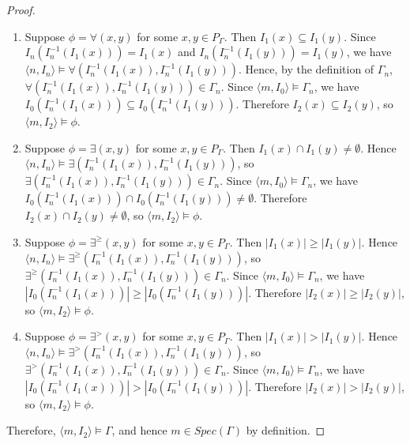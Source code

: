 \documentclass[12pt, reqno]{amsart}
\theoremstyle{definition}
\theoremstyle{remark}
\numberwithin{equation}{section}
\begin{document}
\begin{proof}
\begin{enumerate}

	\item Suppose $\phi=\forall(x,y)$ for some $x,y\in P_\Gamma$. Then $I_1(x)\subseteq I_1(y)$. Since $I_n(I_n^{-1}(I_1(x)))=I_1(x)$ and $I_n(I_n^{-1}(I_1(y)))=I_1(y)$, we have $\langle n,I_n\rangle\models\forall(I_n^{-1}(I_1(x)),I_n^{-1}(I_1(y)))$. Hence, by the definition of $\Gamma_n$, \\$\forall(I_n^{-1}(I_1(x)),I_n^{-1}(I_1(y)))\in\Gamma_n$. Since $\langle m,I_0\rangle\models\Gamma_n$, we have $I_0(I_n^{-1}(I_1(x)))\subseteq I_0(I_n^{-1}(I_1(y)))$. Therefore $I_2(x)\subseteq I_2(y)$, so $\langle m,I_2\rangle\models\phi$.

	\item Suppose $\phi=\exists(x,y)$ for some $x,y\in P_\Gamma$. Then $I_1(x)\cap I_1(y)\neq\emptyset$. Hence $\langle n,I_n\rangle\models\exists(I_n^{-1}(I_1(x)),I_n^{-1}(I_1(y)))$, so $\exists(I_n^{-1}(I_1(x)),I_n^{-1}(I_1(y)))\in\Gamma_n$. Since $\langle m,I_0\rangle\models\Gamma_n$, we have $I_0(I_n^{-1}(I_1(x)))\cap I_0(I_n^{-1}(I_1(y)))\neq\emptyset$. Therefore $I_2(x)\cap I_2(y)\neq\emptyset$, so $\langle m,I_2\rangle\models\phi$.

	\item Suppose $\phi=\exists^{\geq}(x,y)$ for some $x,y\in P_\Gamma$. Then $|I_1(x)|\geq |I_1(y)|$. Hence $\langle n,I_n\rangle\models\exists^{\geq}(I_n^{-1}(I_1(x)),I_n^{-1}(I_1(y)))$, so $\exists^{\geq}(I_n^{-1}(I_1(x)),I_n^{-1}(I_1(y)))\in\Gamma_n$. Since $\langle m,I_0\rangle\models\Gamma_n$, we have $|I_0(I_n^{-1}(I_1(x)))|\geq |I_0(I_n^{-1}(I_1(y)))|$. Therefore $|I_2(x)|\geq |I_2(y)|$, so $\langle m,I_2\rangle\models\phi$.

	\item Suppose $\phi=\exists^{>}(x,y)$ for some $x,y\in P_\Gamma$. Then $|I_1(x)|>|I_1(y)|$. Hence $\langle n,I_n\rangle\models\exists^{>}(I_n^{-1}(I_1(x)),I_n^{-1}(I_1(y)))$, so $\exists^{>}(I_n^{-1}(I_1(x)),I_n^{-1}(I_1(y)))\in\Gamma_n$. Since $\langle m,I_0\rangle\models\Gamma_n$, we have $|I_0(I_n^{-1}(I_1(x)))|>|I_0(I_n^{-1}(I_1(y)))|$. Therefore $|I_2(x)|>|I_2(y)|$, so $\langle m,I_2\rangle\models\phi$.

\end{enumerate}

Therefore, $\langle m,I_2\rangle\models\Gamma$, and hence $m\in Spec(\Gamma)$ by definition.

\end{proof}
\end{document}
